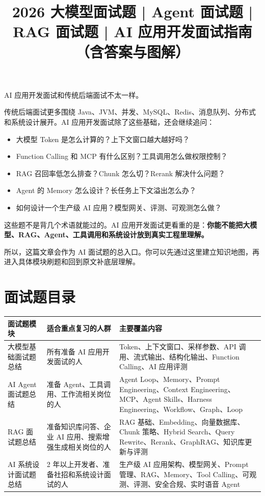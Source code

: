 \documentclass[10pt,a4paper]{ctexart}
\begin{document}
\title{2026 大模型面试题 | Agent 面试题 | RAG 面试题 | AI 应用开发面试指南（含答案与图解）}
\date{}
\maketitle

AI 应用开发面试和传统后端面试不太一样。



传统后端面试更多围绕 Java、JVM、并发、MySQL、Redis、消息队列、分布式和系统设计展开。AI 应用开发面试除了这些基础，还会继续追问：


\begin{itemize}[itemsep=2pt, topsep=4pt]
  \item 大模型 Token 是怎么计算的？上下文窗口越大越好吗？
  \item Function Calling 和 MCP 有什么区别？工具调用怎么做权限控制？
  \item RAG 召回率低怎么排查？Chunk 怎么切？Rerank 解决什么问题？
  \item Agent 的 Memory 怎么设计？长任务上下文溢出怎么办？
  \item 如何设计一个生产级 AI 应用？模型网关、评测、可观测怎么做？
\end{itemize}


这些题不是背几个术语就能过的。AI 应用开发面试更看重的是：\textbf{你能不能把大模型、RAG、Agent、工具调用和系统设计放到真实工程里理解。}



所以，这篇文章会作为 AI 面试题的总入口。你可以先通过这里建立知识地图，再进入具体模块刷题和回到原文补底层理解。



\section{面试题目录}

{\footnotesize
\begin{tabularx}{\textwidth}{|X|X|X|}
\hline
\textbf{面试题模块} & \textbf{适合重点复习的人群} & \textbf{主要覆盖内容} \\
\hline
大模型基础面试题总结 & 所有准备 AI 应用开发面试的人 & Token、上下文窗口、采样参数、API 调用、流式输出、结构化输出、Function Calling、AI 应用评测 \\
\hline
AI Agent 面试题总结 & 准备 Agent、工具调用、工作流相关岗位的人 & Agent Loop、Memory、Prompt Engineering、Context Engineering、MCP、Agent Skills、Harness Engineering、Workflow、Graph、Loop \\
\hline
RAG 面试题总结 & 准备知识库问答、企业 AI 应用、搜索增强生成相关岗位的人 & RAG 基础、Embedding、向量数据库、Chunk 策略、Hybrid Search、Query Rewrite、Rerank、GraphRAG、知识库更新与评测 \\
\hline
AI 系统设计面试题总结 & 2 年以上开发者、准备社招和系统设计面试的人 & 生产级 AI 应用架构、模型网关、Prompt 管理、RAG、Memory、Tool Calling、可观测、评测、安全合规、实时语音 Agent \\
\hline
\end{tabularx}
}
\end{document}
